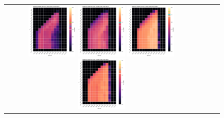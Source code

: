 \begin{figure}[h!]
\begin{tabular}{cccc}
  \includegraphics[width=0.25\textwidth]{Kap8/heatmap_train=b234_test=b278.png}  
  \includegraphics[width=0.25\textwidth]{Kap8/heatmap_train=b261_test=b278.png}
  \includegraphics[width=0.25\textwidth]{Kap8/heatmap_train=b278_test=b261.png} 
   \includegraphics[width=0.25\textwidth]{Kap8/heatmap_train=b360_test=b261.png} \\
   

\end{tabular}
\end{figure}
